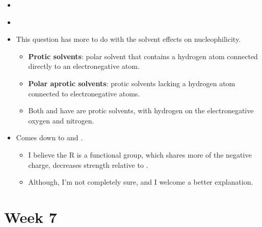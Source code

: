 \documentclass[12pt,a4paper]{article}
\begin{document}
\begin{enumerate}
{\begin{itemize}
        \item {}
        \item {\color{o-Sun}\textbf{}}
    \end{itemize}
    }
    \begin{itemize}
        \item This question has more to do with the solvent effects on nucleophilicity.
            \begin{itemize}
                \item \textbf{Protic solvents}: polar solvent that {\color{o-Sun}contains} a hydrogen atom connected directly to an electronegative atom. 
                \item \textbf{Polar aprotic solvents}: protic solvents {\color{o-Sun}lacking} a hydrogen atom connected to electronegative atoms.
                \item Both  and  have are protic solvents, with hydrogen on the electronegative oxygen and nitrogen.
            \end{itemize}
        \item Comes down to  and .
            \begin{itemize}
                \item I believe the R is a functional group, which shares more of the negative charge, decreases strength relative to . 
                \item Although, I'm not completely sure, and I welcome a better explanation.
            \end{itemize}
    \end{itemize}
\end{enumerate}

\clearpage
\section*{Week 7}
{}

\end{document}
